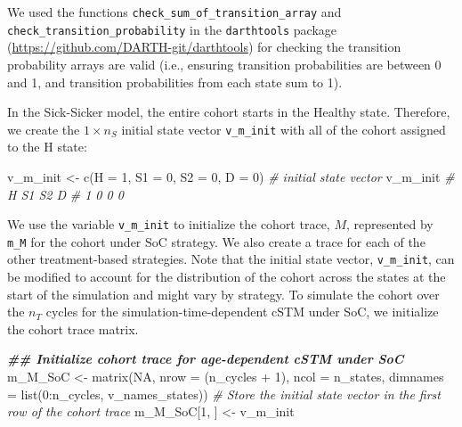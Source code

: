 \documentclass[
]{article}
\newenvironment{Shaded}{\begin{snugshade}}{\end{snugshade}}
\newcommand{\AttributeTok}[1]{\textcolor[rgb]{0.77,0.63,0.00}{#1}}
\newcommand{\CommentTok}[1]{\textcolor[rgb]{0.56,0.35,0.01}{\textit{#1}}}
\newcommand{\ConstantTok}[1]{\textcolor[rgb]{0.00,0.00,0.00}{#1}}
\newcommand{\DecValTok}[1]{\textcolor[rgb]{0.00,0.00,0.81}{#1}}
\newcommand{\DocumentationTok}[1]{\textcolor[rgb]{0.56,0.35,0.01}{\textbf{\textit{#1}}}}
\newcommand{\FunctionTok}[1]{\textcolor[rgb]{0.00,0.00,0.00}{#1}}
\newcommand{\NormalTok}[1]{#1}
\newcommand{\OtherTok}[1]{\textcolor[rgb]{0.56,0.35,0.01}{#1}}
\newcommand{\SpecialCharTok}[1]{\textcolor[rgb]{0.00,0.00,0.00}{#1}}
\begin{document}
We used the functions \texttt{check\_sum\_of\_transition\_array} and \texttt{check\_transition\_probability} in the \texttt{darthtools} package (\url{https://github.com/DARTH-git/darthtools}) for checking the transition probability arrays are valid (i.e., ensuring transition probabilities are between 0 and 1, and transition probabilities from each state sum to 1).

In the Sick-Sicker model, the entire cohort starts in the Healthy state. Therefore, we create the \(1 \times n_S\) initial state vector \texttt{v\_m\_init} with all of the cohort assigned to the H state:

\begin{Shaded}
\begin{Highlighting}[]
\NormalTok{v\_m\_init }\OtherTok{\textless{}{-}} \FunctionTok{c}\NormalTok{(}\AttributeTok{H =} \DecValTok{1}\NormalTok{, }\AttributeTok{S1 =} \DecValTok{0}\NormalTok{, }\AttributeTok{S2 =} \DecValTok{0}\NormalTok{, }\AttributeTok{D =} \DecValTok{0}\NormalTok{) }\CommentTok{\# initial state vector}
\NormalTok{v\_m\_init}
\CommentTok{\#  H S1 S2  D }
\CommentTok{\#  1  0  0  0}
\end{Highlighting}
\end{Shaded}

We use the variable \texttt{v\_m\_init} to initialize the cohort trace, \(M\), represented by \texttt{m\_M} for the cohort under SoC strategy. We also create a trace for each of the other treatment-based strategies. Note that the initial state vector, \texttt{v\_m\_init}, can be modified to account for the distribution of the cohort across the states at the start of the simulation and might vary by strategy. To simulate the cohort over the \(n_T\) cycles for the simulation-time-dependent cSTM under SoC, we initialize the cohort trace matrix.

\begin{Shaded}
\begin{Highlighting}[]
\DocumentationTok{\#\# Initialize cohort trace for age{-}dependent cSTM under SoC}
\NormalTok{m\_M\_SoC }\OtherTok{\textless{}{-}} \FunctionTok{matrix}\NormalTok{(}\ConstantTok{NA}\NormalTok{, }
                 \AttributeTok{nrow =}\NormalTok{ (n\_cycles }\SpecialCharTok{+} \DecValTok{1}\NormalTok{), }\AttributeTok{ncol =}\NormalTok{ n\_states, }
                 \AttributeTok{dimnames =} \FunctionTok{list}\NormalTok{(}\DecValTok{0}\SpecialCharTok{:}\NormalTok{n\_cycles, v\_names\_states))}
\CommentTok{\# Store the initial state vector in the first row of the cohort trace}
\NormalTok{m\_M\_SoC[}\DecValTok{1}\NormalTok{, ] }\OtherTok{\textless{}{-}}\NormalTok{ v\_m\_init}
\end{Highlighting}
\end{Shaded}
\end{document}
